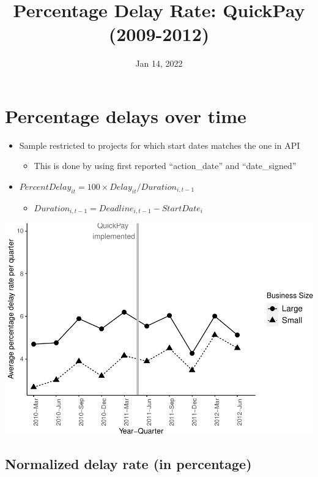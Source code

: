 \documentclass[
]{article}
\title{Percentage Delay Rate: QuickPay (2009-2012)}
\author{}
\date{\vspace{-2.5em}Jan 14, 2022}
\providecommand{\tightlist}{%
  \setlength{\itemsep}{0pt}\setlength{\parskip}{0pt}}
\begin{document}
\maketitle

\hypertarget{percentage-delays-over-time}{%
\section{Percentage delays over
time}\label{percentage-delays-over-time}}

\begin{itemize}
\tightlist
\item
  Sample restricted to projects for which start dates matches the one in
  API

  \begin{itemize}
  \tightlist
  \item
    This is done by using first reported ``action\_date'' and
    ``date\_signed''
  \end{itemize}
\item
  \(PercentDelay_{it}=100 \times Delay_{it}/Duration_{i,t-1}\)

  \begin{itemize}
  \tightlist
  \item
    \(Duration_{i,t-1} = Deadline_{i,t-1} - StartDate_i\)
  \end{itemize}
\end{itemize}

\includegraphics{qp_first_pc_delay_files/figure-latex/plot_pc_delay-1.pdf}

\hypertarget{normalized-delay-rate-in-percentage}{%
\subsection{Normalized delay rate (in
percentage)}\label{normalized-delay-rate-in-percentage}}
\end{document}
